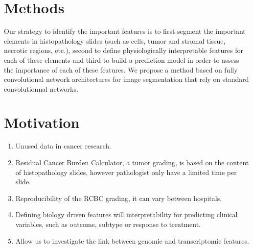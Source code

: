 \documentclass[a0,portrait]{a0poster}
\begin{document}
\begin{multicols}{2}



\color{SaddleBrown} %

\section*{Methods}

Our strategy to identify the important features is to first segment the important elements in histopathology slides (such as cells, tumor and stromal tissue, necrotic regions, etc.), second to define physiologically interpretable features for each of these elements and third to build a prediction model in order to assess the importance of each of these features.
We propose a method based on fully convolutional network  architectures for image segmentation that rely on standard convolutionnal networks.

\color{DarkSlateGray} %

\section*{Motivation}

\begin{enumerate}
\item Unused data in cancer research.
\item Residual Cancer Burden Calculator, a tumor grading, is based on the content of histopathology slides, however pathologist only have a limited time per slide.
\item Reproducibility of the RCBC grading, it can vary between hospitals.
\item Defining biology driven features will interpretability for predicting clinical variables, such as outcome, subtype or response to treatment.
\item Allow us to investigate the link between genomic and transcriptomic features.
\end{enumerate}


\end{multicols}
\end{document}
